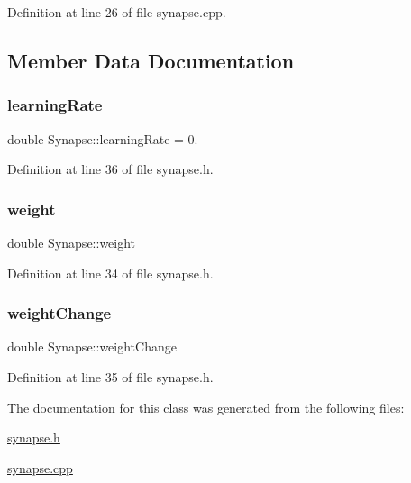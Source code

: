 Definition at line 26 of file synapse.\+cpp.



\subsection{Member Data Documentation}
\mbox{\label{class_synapse_a1ea4d11c389bcf1e090c5f74c7c3f9ac}} 
\subsubsection{\texorpdfstring{learning\+Rate}{learningRate}}
{\footnotesize\ttfamily double Synapse\+::learning\+Rate = 0.\hspace{0.3cm}{\ttfamily [static]}}



Definition at line 36 of file synapse.\+h.

\mbox{\label{class_synapse_a44d98296097d0130667a45ee2645fe2b}} 
\subsubsection{\texorpdfstring{weight}{weight}}
{\footnotesize\ttfamily double Synapse\+::weight}



Definition at line 34 of file synapse.\+h.

\mbox{\label{class_synapse_a6346dada19b7ff4cd5a20764e07665c3}} 
\subsubsection{\texorpdfstring{weight\+Change}{weightChange}}
{\footnotesize\ttfamily double Synapse\+::weight\+Change}



Definition at line 35 of file synapse.\+h.



The documentation for this class was generated from the following files\+:\begin{DoxyCompactItemize}
\item 
\hyperlink{synapse_8h}{synapse.\+h}\item 
\hyperlink{synapse_8cpp}{synapse.\+cpp}\end{DoxyCompactItemize}
